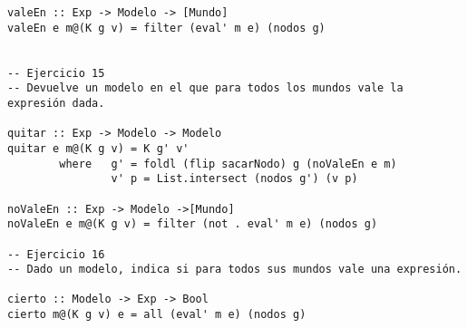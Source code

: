 \begin{verbatim}
valeEn :: Exp -> Modelo -> [Mundo]
valeEn e m@(K g v) = filter (eval' m e) (nodos g)


-- Ejercicio 15
-- Devuelve un modelo en el que para todos los mundos vale la expresión dada.

quitar :: Exp -> Modelo -> Modelo
quitar e m@(K g v) = K g' v'
        where   g' = foldl (flip sacarNodo) g (noValeEn e m)
                v' p = List.intersect (nodos g') (v p)

noValeEn :: Exp -> Modelo ->[Mundo]
noValeEn e m@(K g v) = filter (not . eval' m e) (nodos g)

-- Ejercicio 16
-- Dado un modelo, indica si para todos sus mundos vale una expresión.

cierto :: Modelo -> Exp -> Bool
cierto m@(K g v) e = all (eval' m e) (nodos g)

\end{verbatim}
